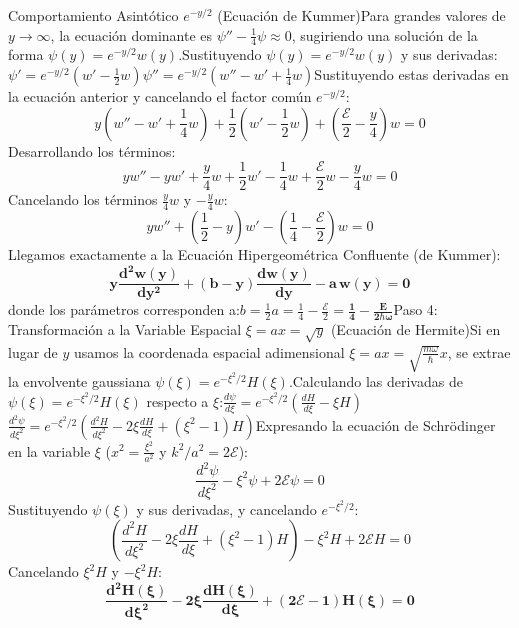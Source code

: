 \documentclass[12pt]{article}
\begin{document}
Comportamiento Asintótico $e^{-y/2}$ (Ecuación de Kummer)Para grandes valores de $y \to \infty$, la ecuación dominante es $\psi'' - \frac{1}{4}\psi \approx 0$, sugiriendo una solución de la forma $\psi(y) = e^{-y/2} w(y)$.Sustituyendo $\psi(y) = e^{-y/2} w(y)$ y sus derivadas:$\psi' = e^{-y/2} \left( w' - \frac{1}{2}w \right)$$\psi'' = e^{-y/2} \left( w'' - w' + \frac{1}{4}w \right)$Sustituyendo estas derivadas en la ecuación anterior y cancelando el factor común $e^{-y/2}$:$$y \left( w'' - w' + \frac{1}{4}w \right) + \frac{1}{2} \left( w' - \frac{1}{2}w \right) + \left( \frac{\mathcal{E}}{2} - \frac{y}{4} \right) w = 0$$Desarrollando los términos:$$y w'' - y w' + \frac{y}{4}w + \frac{1}{2} w' - \frac{1}{4}w + \frac{\mathcal{E}}{2}w - \frac{y}{4}w = 0$$Cancelando los términos $\frac{y}{4}w$ y $-\frac{y}{4}w$:$$y w'' + \left(\frac{1}{2} - y\right) w' - \left( \frac{1}{4} - \frac{\mathcal{E}}{2} \right) w = 0$$Llegamos exactamente a la Ecuación Hipergeométrica Confluente (de Kummer):$$\mathbf{y \frac{d^2 w(y)}{dy^2} + (b - y) \frac{dw(y)}{dy} - a \, w(y) = 0}$$donde los parámetros corresponden a:$b = \frac{1}{2}$$a = \frac{1}{4} - \frac{\mathcal{E}}{2} = \mathbf{\frac{1}{4} - \frac{E}{2\hbar\omega}}$Paso 4: Transformación a la Variable Espacial $\xi = ax = \sqrt{y}$ (Ecuación de Hermite)Si en lugar de $y$ usamos la coordenada espacial adimensional $\xi = ax = \sqrt{\frac{m\omega}{\hbar}} x$, se extrae la envolvente gaussiana $\psi(\xi) = e^{-\xi^2/2} H(\xi)$.Calculando las derivadas de $\psi(\xi) = e^{-\xi^2/2} H(\xi)$ respecto a $\xi$:$\frac{d\psi}{d\xi} = e^{-\xi^2/2} \left( \frac{dH}{d\xi} - \xi H \right)$$\frac{d^2\psi}{d\xi^2} = e^{-\xi^2/2} \left( \frac{d^2H}{d\xi^2} - 2\xi \frac{dH}{d\xi} + (\xi^2 - 1) H \right)$Expresando la ecuación de Schrödinger en la variable $\xi$ ($x^2 = \frac{\xi^2}{a^2}$ y $k^2/a^2 = 2\mathcal{E}$):$$\frac{d^2\psi}{d\xi^2} - \xi^2 \psi + 2\mathcal{E} \psi = 0$$Sustituyendo $\psi(\xi)$ y sus derivadas, y cancelando $e^{-\xi^2/2}$:$$\left( \frac{d^2H}{d\xi^2} - 2\xi \frac{dH}{d\xi} + (\xi^2 - 1) H \right) - \xi^2 H + 2\mathcal{E} H = 0$$Cancelando $\xi^2 H$ y $-\xi^2 H$:$$\mathbf{\frac{d^2 H(\xi)}{d\xi^2} - 2\xi \frac{dH(\xi)}{d\xi} + (2\mathcal{E} - 1) H(\xi) = 0}$$
\end{document}
